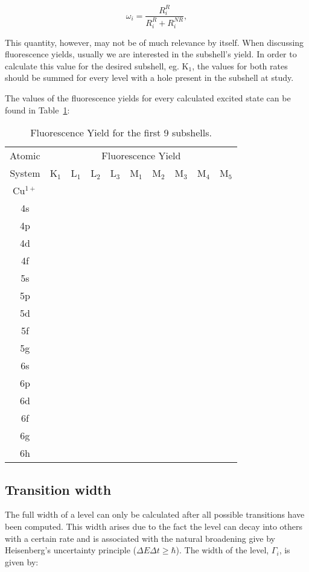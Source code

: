 \begin{equation}
    \omega_i=\frac{R_i^{R}}{R_i^{R}+R_i^{NR}},
\end{equation}

This quantity, however, may not be of much relevance by itself. When discussing fluorescence yields, usually we are interested in the subshell's yield. In order to calculate this value for the desired subshell, eg. K$_1$, the values for both rates should be summed for every level with a hole present in the subshell at study.

The values of the fluorescence yields for every calculated excited state can be found in Table~\ref{tab:FY}:

\begin{table}[h!]
    \centering
    \caption{Fluorescence Yield for the first 9 subshells.}
    \label{tab:FY}
    \begin{tabular}{c||c|c|c|c|c|c|c|c|c}
        \toprule Atomic&\multicolumn{9}{c}{Fluorescence Yield}\\
        System&K$_1$&L$_1$&L$_2$&L$_3$&M$_1$&M$_2$&M$_3$&M$_4$&M$_5$\\
        \midrule
        Cu$^{1+}$ \\ 
        4s&  \\
        4p &  &\\
        4d & &\\
        4f & \\
        5s & \\
        5p & \\
        5d & \\
        5f & \\
        5g & \\
        6s & \\
        6p & \\
        6d & \\
        6f & \\
        6g & \\
        6h\\
        \bottomrule
    \end{tabular}
\end{table}

\subsection{Transition width}

The full width of a level can only be calculated after all possible transitions have been computed. This width arises due to the fact the level can decay into others with a certain rate and is associated with the natural broadening give by Heisenberg's uncertainty principle ($\Delta E \Delta t\geq \hbar$). The width of the level, $\Gamma_i$, is given by:

